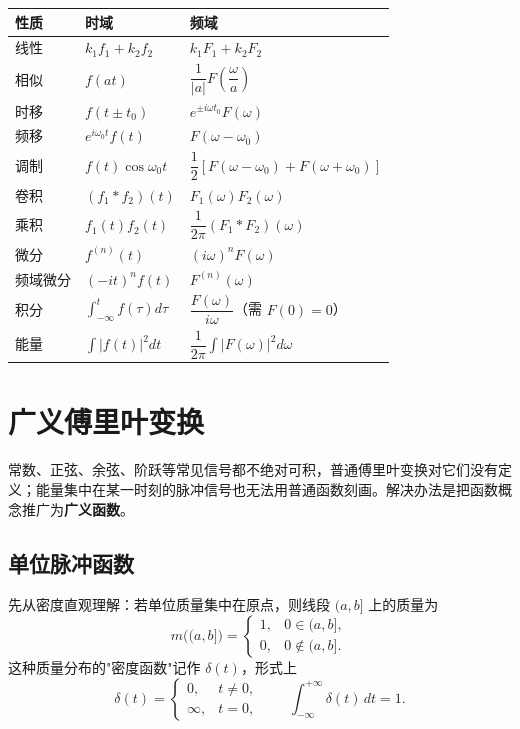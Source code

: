 \begin{center}
\begin{tabular}{@{}lll@{}}
\toprule
性质 & 时域 & 频域 \\
\midrule
线性 & \(k_1f_1+k_2f_2\) & \(k_1F_1+k_2F_2\) \\
相似 & \(f(at)\) & \(\dfrac{1}{|a|}F\!\left(\dfrac{\omega}{a}\right)\) \\
时移 & \(f(t\pm t_0)\) & \(e^{\pm i\omega t_0}F(\omega)\) \\
频移 & \(e^{i\omega_0t}f(t)\) & \(F(\omega-\omega_0)\) \\
调制 & \(f(t)\cos\omega_0t\) & \(\dfrac{1}{2}\left[F(\omega-\omega_0)+F(\omega+\omega_0)\right]\) \\
卷积 & \((f_1*f_2)(t)\) & \(F_1(\omega)F_2(\omega)\) \\
乘积 & \(f_1(t)f_2(t)\) & \(\dfrac{1}{2\pi}(F_1*F_2)(\omega)\) \\
微分 & \(f^{(n)}(t)\) & \((i\omega)^nF(\omega)\) \\
频域微分 & \((-it)^nf(t)\) & \(F^{(n)}(\omega)\) \\
积分 & \(\displaystyle\int_{-\infty}^{t}f(\tau)d\tau\) & \(\dfrac{F(\omega)}{i\omega}\)（需 \(F(0)=0\)） \\
能量 & \(\displaystyle\int|f(t)|^2dt\) & \(\dfrac{1}{2\pi}\displaystyle\int|F(\omega)|^2d\omega\) \\
\bottomrule
\end{tabular}
\end{center}

\section{广义傅里叶变换}

常数、正弦、余弦、阶跃等常见信号都不绝对可积，普通傅里叶变换对它们没有定义；能量集中在某一时刻的脉冲信号也无法用普通函数刻画。解决办法是把函数概念推广为\textbf{广义函数}。

\subsection{单位脉冲函数}

先从密度直观理解：若单位质量集中在原点，则线段 \((a,b]\) 上的质量为
\[
m\big((a,b]\big)=
\begin{cases}
1, & 0\in(a,b],\\
0, & 0\notin(a,b].
\end{cases}
\]
这种质量分布的"密度函数"记作 \(\delta(t)\)，形式上
\[
\delta(t)=
\begin{cases}
0, & t\neq0,\\
\infty, & t=0,
\end{cases}
\qquad
\int_{-\infty}^{+\infty}\delta(t)\,dt=1 .
\]

